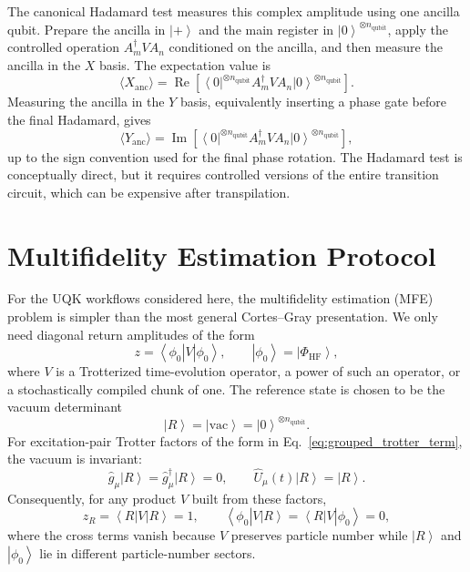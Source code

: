 \documentclass[11pt]{article}
\newcommand{\ket}[1]{\left|#1\right\rangle}
\newcommand{\bra}[1]{\left\langle#1\right|}
\begin{document}
The canonical Hadamard test measures this complex amplitude using one ancilla qubit.  Prepare the ancilla in $\ket{+}$ and the main register in $\ket{0}^{\otimes n_{\mathrm{qubit}}}$, apply the controlled operation $A_m^\dagger V A_n$ conditioned on the ancilla, and then measure the ancilla in the $X$ basis.  The expectation value is
\begin{equation}
    \langle X_{\mathrm{anc}}\rangle
    = \operatorname{Re}\left[
    \bra{0}^{\otimes n_{\mathrm{qubit}}}A_m^\dagger V A_n\ket{0}^{\otimes n_{\mathrm{qubit}}}
    \right].
\end{equation}
Measuring the ancilla in the $Y$ basis, equivalently inserting a phase gate before the final Hadamard, gives
\begin{equation}
    \langle Y_{\mathrm{anc}}\rangle
    = \operatorname{Im}\left[
    \bra{0}^{\otimes n_{\mathrm{qubit}}}A_m^\dagger V A_n\ket{0}^{\otimes n_{\mathrm{qubit}}}
    \right],
\end{equation}
up to the sign convention used for the final phase rotation.  The Hadamard test is conceptually direct, but it requires controlled versions of the entire transition circuit, which can be expensive after transpilation.

\section{Multifidelity Estimation Protocol}

For the UQK workflows considered here, the multifidelity estimation (MFE) problem is simpler than the most general Cortes--Gray presentation.  We only need diagonal return amplitudes of the form
\begin{equation}
    z=\bra{\phi_0}V\ket{\phi_0},
    \qquad \ket{\phi_0}=\ket{\Phi_{\mathrm{HF}}},
    \label{eq:mfe_target_diagonal}
\end{equation}
where $V$ is a Trotterized time-evolution operator, a power of such an operator, or a stochastically compiled chunk of one.  The reference state is chosen to be the vacuum determinant
\begin{equation}
    \ket{R}=\ket{\mathrm{vac}}=\ket{0}^{\otimes n_{\mathrm{qubit}}}.
\end{equation}
For excitation-pair Trotter factors of the form in Eq.~\eqref{eq:grouped_trotter_term}, the vacuum is invariant:
\begin{equation}
    \hat{g}_\mu\ket{R}=\hat{g}_\mu^\dagger\ket{R}=0,
    \qquad
    \hat{U}_\mu(t)\ket{R}=\ket{R}.
\end{equation}
Consequently, for any product $V$ built from these factors,
\begin{equation}
    z_R=\bra{R}V\ket{R}=1,
    \qquad
    \bra{\phi_0}V\ket{R}=\bra{R}V\ket{\phi_0}=0,
    \label{eq:mfe_vacuum_reference}
\end{equation}
where the cross terms vanish because $V$ preserves particle number while $\ket{R}$ and $\ket{\phi_0}$ lie in different particle-number sectors.
\end{document}
